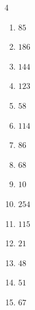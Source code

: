 \begin{multicols}{4}
\begin{enumerate}
  \item $85$


  \item $186$


  \item $144$


  \item $123$


  \item $58$


  \item $114$


  \item $86$


  \item $68$


\columnbreak %

\resetques

  \item $10$


  \item $254$


  \item $115$


  \item $21$


  \item $48$


  \item $51$


  \item $67$



\end{enumerate}
\end{multicols}
